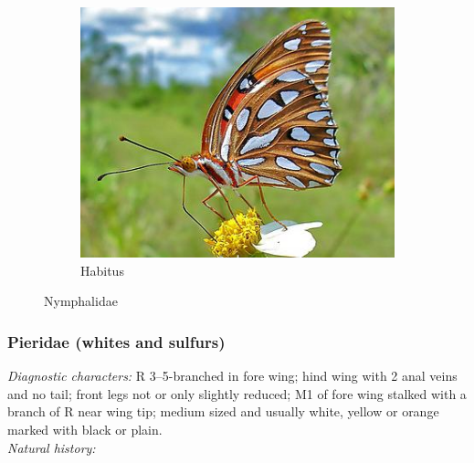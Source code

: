 \documentclass[letterpaper, 11pt]{article}
\begin{document}
\begin{figure}[ht!]
\begin{subfigure}[ht!]{0.5\textwidth}
        \includegraphics[width=\textwidth]{image28}
        \caption{Habitus}
        \label{fig:nymphalid2}
    \end{subfigure}
    \caption{Nymphalidae}\label{fig:nymphalids}
\end{figure}

\subsubsection{Pieridae (whites and sulfurs)}
\noindent{}\textit{Diagnostic characters:} R 3--5-branched in fore wing; hind wing with 2 anal veins and no tail; front legs not or only slightly reduced; M1 of fore wing stalked with a branch of R near wing tip; medium sized and usually white, yellow or orange marked with black or plain.\\

\noindent{}\textit{Natural history:} 
\end{document}
